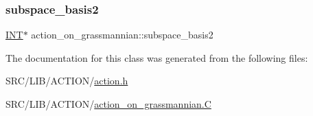 \subsubsection{\texorpdfstring{subspace\+\_\+basis2}{subspace\_basis2}}
{\footnotesize\ttfamily \mbox{\hyperlink{galois_8h_a09fddde158a3a20bd2dcadb609de11dc}{I\+NT}}$\ast$ action\+\_\+on\+\_\+grassmannian\+::subspace\+\_\+basis2}



The documentation for this class was generated from the following files\+:\begin{DoxyCompactItemize}
\item 
S\+R\+C/\+L\+I\+B/\+A\+C\+T\+I\+O\+N/\mbox{\hyperlink{action_8h}{action.\+h}}\item 
S\+R\+C/\+L\+I\+B/\+A\+C\+T\+I\+O\+N/\mbox{\hyperlink{action__on__grassmannian_8_c}{action\+\_\+on\+\_\+grassmannian.\+C}}\end{DoxyCompactItemize}
